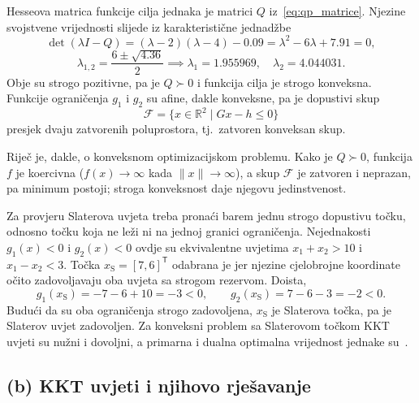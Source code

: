 Hesseova matrica funkcije cilja jednaka je matrici $Q$ iz~\eqref{eq:qp_matrice}. Njezine svojstvene vrijednosti slijede iz karakteristične jednadžbe
\begin{equation}
\det(\lambda I - Q) = (\lambda - 2)(\lambda - 4) - 0.09 = \lambda^2 - 6\lambda + 7.91 = 0,
\end{equation}
\begin{equation}
\lambda_{1,2} = \frac{6 \pm \sqrt{4.36}}{2} \implies \lambda_1 = 1.955969, \quad \lambda_2 = 4.044031.
\end{equation}
Obje su strogo pozitivne, pa je $Q \succ 0$ i funkcija cilja je strogo konveksna. Funkcije ograničenja $g_1$ i $g_2$ su afine, dakle konveksne, pa je dopustivi skup
\begin{equation}
\mathcal{F} = \{x \in \mathbb{R}^2 \mid Gx - h \leq 0\}
\end{equation}
presjek dvaju zatvorenih poluprostora, tj.\ zatvoren konveksan skup.

Riječ je, dakle, o konveksnom optimizacijskom problemu. Kako je \mbox{$Q \succ 0$}, funkcija $f$ je koercivna (\mbox{$f(x) \to \infty$} kada \mbox{$\|x\| \to \infty$}), a skup $\mathcal{F}$ je zatvoren i neprazan, pa minimum postoji; stroga konveksnost daje njegovu jedinstvenost.

Za provjeru Slaterova uvjeta treba pronaći barem jednu strogo dopustivu točku, odnosno točku koja ne leži ni na jednoj granici ograničenja. Nejednakosti \mbox{$g_1(x)<0$} i \mbox{$g_2(x)<0$} ovdje su ekvivalentne uvjetima \mbox{$x_1+x_2>10$} i \mbox{$x_1-x_2<3$}. Točka \mbox{$x_{\mathrm{S}}=[7,6]^{\mathsf{T}}$} odabrana je jer njezine cjelobrojne koordinate očito zadovoljavaju oba uvjeta sa strogom rezervom. Doista,
\begin{equation}
g_1(x_{\mathrm{S}})=-7-6+10=-3<0, \qquad
g_2(x_{\mathrm{S}})=7-6-3=-2<0.
\end{equation}
Budući da su oba ograničenja strogo zadovoljena, $x_{\mathrm{S}}$ je Slaterova točka, pa je Slaterov uvjet zadovoljen. Za konveksni problem sa Slaterovom točkom KKT uvjeti su nužni i dovoljni, a primarna i dualna optimalna vrijednost jednake su~\mbox{\cite[str.~16--17]{jokic2025dualnost}}.

\subsection{(b) KKT uvjeti i njihovo rješavanje}

